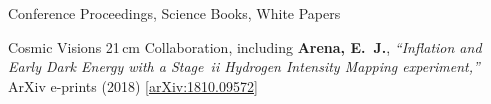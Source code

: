 \documentclass{resume} %
\begin{document}
\begin{rSection}{Conference Proceedings, Science Books, White Papers}
\begin{etaremune}
\item {Cosmic Visions 21$\,$cm Collaboration}, including \textbf{{Arena}, E.~J.},
  \textit{``Inflation and Early Dark Energy with a {Stage~{\sc ii}} Hydrogen Intensity Mapping experiment,''} ArXiv e-prints (2018) \href{https://arxiv.org/abs/1810.09572}{[arXiv:1810.09572]}


\end{etaremune}

\end{rSection}

\end{document}
